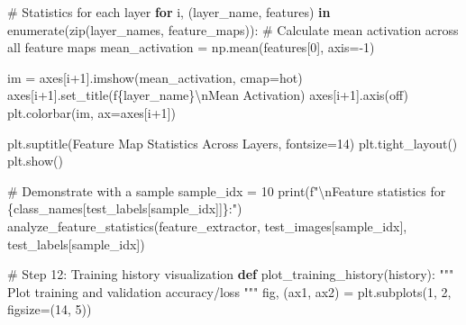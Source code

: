 \documentclass[
  letterpaper,
  DIV=11,
  numbers=noendperiod]{scrreprt}
\newenvironment{Shaded}{\begin{snugshade}}{\end{snugshade}}
\newcommand{\BuiltInTok}[1]{\textcolor[rgb]{0.00,0.23,0.31}{#1}}
\newcommand{\CharTok}[1]{\textcolor[rgb]{0.13,0.47,0.30}{#1}}
\newcommand{\CommentTok}[1]{\textcolor[rgb]{0.37,0.37,0.37}{#1}}
\newcommand{\ControlFlowTok}[1]{\textcolor[rgb]{0.00,0.23,0.31}{\textbf{#1}}}
\newcommand{\DecValTok}[1]{\textcolor[rgb]{0.68,0.00,0.00}{#1}}
\newcommand{\KeywordTok}[1]{\textcolor[rgb]{0.00,0.23,0.31}{\textbf{#1}}}
\newcommand{\NormalTok}[1]{\textcolor[rgb]{0.00,0.23,0.31}{#1}}
\newcommand{\OperatorTok}[1]{\textcolor[rgb]{0.37,0.37,0.37}{#1}}
\newcommand{\SpecialCharTok}[1]{\textcolor[rgb]{0.37,0.37,0.37}{#1}}
\newcommand{\SpecialStringTok}[1]{\textcolor[rgb]{0.13,0.47,0.30}{#1}}
\newcommand{\StringTok}[1]{\textcolor[rgb]{0.13,0.47,0.30}{#1}}
\begin{document}
\begin{Shaded}
\begin{Highlighting}[]
    \CommentTok{\# Statistics for each layer}
    \ControlFlowTok{for}\NormalTok{ i, (layer\_name, features) }\KeywordTok{in} \BuiltInTok{enumerate}\NormalTok{(}\BuiltInTok{zip}\NormalTok{(layer\_names, feature\_maps)):}
        \CommentTok{\# Calculate mean activation across all feature maps}
\NormalTok{        mean\_activation }\OperatorTok{=}\NormalTok{ np.mean(features[}\DecValTok{0}\NormalTok{], axis}\OperatorTok{={-}}\DecValTok{1}\NormalTok{)}
        
\NormalTok{        im }\OperatorTok{=}\NormalTok{ axes[i}\OperatorTok{+}\DecValTok{1}\NormalTok{].imshow(mean\_activation, cmap}\OperatorTok{=}\StringTok{\textquotesingle{}hot\textquotesingle{}}\NormalTok{)}
\NormalTok{        axes[i}\OperatorTok{+}\DecValTok{1}\NormalTok{].set\_title(}\SpecialStringTok{f\textquotesingle{}}\SpecialCharTok{\{}\NormalTok{layer\_name}\SpecialCharTok{\}}\CharTok{\textbackslash{}n}\SpecialStringTok{Mean Activation\textquotesingle{}}\NormalTok{)}
\NormalTok{        axes[i}\OperatorTok{+}\DecValTok{1}\NormalTok{].axis(}\StringTok{\textquotesingle{}off\textquotesingle{}}\NormalTok{)}
\NormalTok{        plt.colorbar(im, ax}\OperatorTok{=}\NormalTok{axes[i}\OperatorTok{+}\DecValTok{1}\NormalTok{])}
    
\NormalTok{    plt.suptitle(}\StringTok{\textquotesingle{}Feature Map Statistics Across Layers\textquotesingle{}}\NormalTok{, fontsize}\OperatorTok{=}\DecValTok{14}\NormalTok{)}
\NormalTok{    plt.tight\_layout()}
\NormalTok{    plt.show()}

\CommentTok{\# Demonstrate with a sample}
\NormalTok{sample\_idx }\OperatorTok{=} \DecValTok{10}
\BuiltInTok{print}\NormalTok{(}\SpecialStringTok{f"}\CharTok{\textbackslash{}n}\SpecialStringTok{Feature statistics for }\SpecialCharTok{\{}\NormalTok{class\_names[test\_labels[sample\_idx]]}\SpecialCharTok{\}}\SpecialStringTok{:"}\NormalTok{)}
\NormalTok{analyze\_feature\_statistics(feature\_extractor, test\_images[sample\_idx], test\_labels[sample\_idx])}

\CommentTok{\# Step 12: Training history visualization}
\KeywordTok{def}\NormalTok{ plot\_training\_history(history):}
    \CommentTok{"""}
\CommentTok{    Plot training and validation accuracy/loss}
\CommentTok{    """}
\NormalTok{    fig, (ax1, ax2) }\OperatorTok{=}\NormalTok{ plt.subplots(}\DecValTok{1}\NormalTok{, }\DecValTok{2}\NormalTok{, figsize}\OperatorTok{=}\NormalTok{(}\DecValTok{14}\NormalTok{, }\DecValTok{5}\NormalTok{))}
    

\end{Highlighting}
\end{Shaded}
\end{document}
